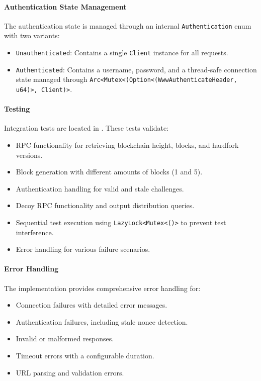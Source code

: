 \documentclass[12pt,a4paper]{article}
\begin{document}
\paragraph{Authentication State Management}
The authentication state is managed through an internal \texttt{Authentication} enum with two variants:
\begin{itemize}
    \item \texttt{Unauthenticated}: Contains a single \texttt{Client} instance for all requests.
    \item \texttt{Authenticated}: Contains a username, password, and a thread-safe connection state managed through \texttt{Arc<Mutex<(Option<(WwwAuthenticateHeader, u64)>, Client)>}.
\end{itemize}

\paragraph{Testing}
Integration tests are located in .  These tests validate:
\begin{itemize}
    \item RPC functionality for retrieving blockchain height, blocks, and hardfork versions.
    \item Block generation with different amounts of blocks (1 and 5).
    \item Authentication handling for valid and stale challenges.
    \item Decoy RPC functionality and output distribution queries.
    \item Sequential test execution using \texttt{LazyLock<Mutex<()>} to prevent test interference.
    \item Error handling for various failure scenarios.
\end{itemize}

\paragraph{Error Handling}
The implementation provides comprehensive error handling for:
\begin{itemize}
    \item Connection failures with detailed error messages.
    \item Authentication failures, including stale nonce detection.
    \item Invalid or malformed responses.
    \item Timeout errors with a configurable duration.
    \item URL parsing and validation errors.
\end{itemize}
\end{document}
